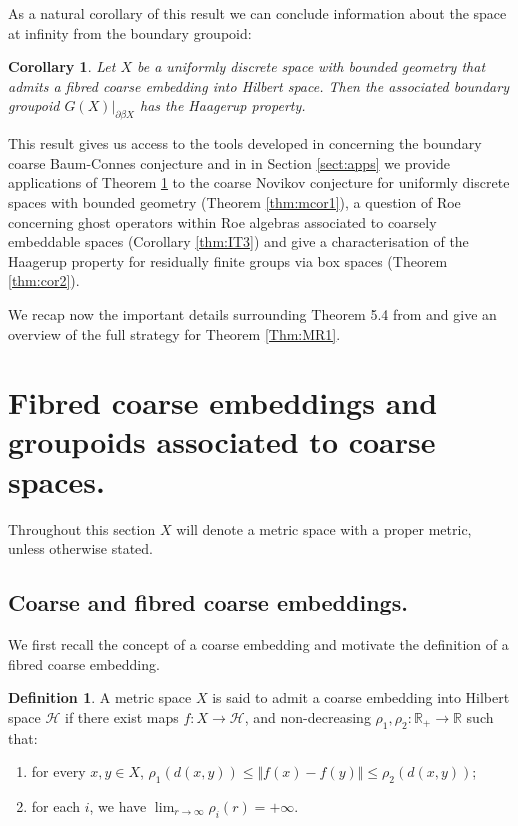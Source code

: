 \documentclass[11pt]{amsart}
\theoremstyle{plain}
\newtheorem{corollary}[theorem]{Corollary}%
\theoremstyle{definition}%
\newtheorem{definition}[theorem]{Definition}%
\theoremstyle{remark}%
\begin{document}
As a natural corollary of this result we can conclude information about the space at infinity from the boundary groupoid:

\begin{corollary}\label{Thm:MT1}
Let $X$ be a uniformly discrete space with bounded geometry that admits a fibred coarse embedding into Hilbert space. Then the associated boundary groupoid $G(X)|_{\partial\beta X}$ has the Haagerup property.
\end{corollary}

This result gives us access to the tools developed in \cite{mypub1} concerning the boundary coarse Baum-Connes conjecture and in in Section \ref{sect:apps} we provide applications of Theorem \ref{Thm:MT1} to the coarse Novikov conjecture for uniformly discrete spaces with bounded geometry (Theorem \ref{thm:mcor1}), a question of Roe concerning ghost operators within Roe algebras associated to coarsely embeddable spaces (Corollary \ref{thm:IT3}) 
and give a characterisation of the Haagerup property for residually finite groups via box spaces (Theorem \ref{thm:cor2}). %

We recap now the important details surrounding Theorem 5.4 from \cite{MR1905840} and give an overview of the full strategy for Theorem \ref{Thm:MR1}.

\section{Fibred coarse embeddings and groupoids associated to coarse spaces.}\label{sect:coarse}
Throughout this section $X$ will denote a metric space with a proper metric, unless otherwise stated.

\subsection{Coarse and fibred coarse embeddings.}
We first recall the concept of a coarse embedding and motivate the definition of a fibred coarse embedding.

\begin{definition}\label{def:FCE}
A metric space $X$ is said to admit a coarse embedding into Hilbert space $\mathcal{H}$ if there exist maps $f:X \rightarrow \mathcal{H}$,  and non-decreasing $\rho_{1},\rho_{2}:\mathbb{R}_{+} \rightarrow \mathbb{R}$ such that:
\begin{enumerate}
\item for every $x,y \in X$, $\rho_{1}(d(x,y)) \leq \Vert f(x) - f(y) \Vert \leq \rho_{2}(d(x,y))$;
\item for each $i$, we have $\lim_{r \rightarrow \infty}\rho_{i}(r) = +\infty$.
\end{enumerate}
\end{definition}
\end{document}

